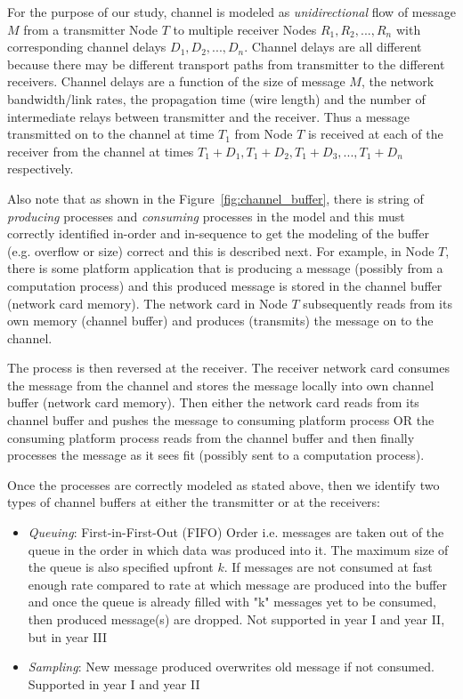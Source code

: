 For the purpose of our study, channel is modeled as \emph{unidirectional} flow of message $M$ from a transmitter Node $T$ to multiple receiver Nodes $R_1,R_2,...,R_n$ with corresponding channel delays $D_1,D_2,...,D_n$. Channel delays are all different because there may be different transport paths from transmitter to the different receivers. Channel delays are a function of the size of message $M$, the network bandwidth/link rates, the propagation time (wire length) and the number of intermediate relays between transmitter and the receiver. Thus a message transmitted on to the channel at time $T_1$ from Node $T$ is received at each of the receiver from the channel at times $T_1+D_1, T_1+D_2, T_1+D_3,...,T_1+D_n$ respectively.

Also note that as shown in the Figure~\ref{fig:channel_buffer}, there is string of \emph{producing} processes and \emph{consuming} processes in the model and this must correctly identified in-order and in-sequence to get the modeling of the buffer (e.g. overflow or size) correct and this is described next. For example, in Node $T$, there is some platform application that is producing a message (possibly from a computation process) and this produced message is stored in the channel buffer (network card memory). The network card in Node $T$ subsequently reads from its own memory (channel buffer) and produces (transmits) the message on to the channel. 

The process is then reversed at the receiver. The receiver network card consumes the message from the channel and stores the message locally into own channel buffer (network card memory). Then either the network card reads from its channel buffer and pushes the message to consuming platform process OR the consuming platform process reads from the channel buffer and then finally processes the message as it sees fit (possibly sent to a computation process).

Once the processes are correctly modeled as stated above, then we identify two types of channel buffers at either the transmitter or at the receivers:
\begin{itemize}
\item \emph{Queuing}: First-in-First-Out (FIFO) Order i.e. messages are taken out of the queue in the order in which data was produced into it.  The maximum size of the queue is also specified upfront $k$. If messages are not consumed at fast enough rate compared to rate at which message are produced into the buffer and once the queue is already filled with "k" messages yet to be consumed, then produced message(s) are dropped. Not supported in year I and year II, but in year III

\item \emph{Sampling}: New message produced overwrites old message if not consumed. Supported in year I and year II

\end{itemize}
